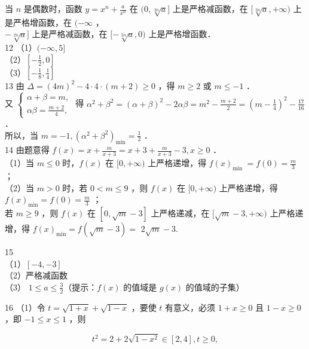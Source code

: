 \documentclass[10pt]{article}
\begin{document}
当 \(n\) 是偶数时，函数 \(y=x^{n}+\frac{a}{x^{n}}\) 在 \((0, \sqrt[2 n]{a}]\) 上是严格减函数，在 \([\sqrt[2 n]{a},+\infty)\) 上是严格增函数，在 \((-\infty\) ，\\
\(-\sqrt[2 n]{a}]\) 上是严格减函数，在 \([-\sqrt[2 n]{a}, 0)\) 上是严格增函数．\\
12 （1）\((-\infty, 5]\)\\
（2）\(\left[-\frac{1}{2}, 0\right]\)\\
（3）\(\left[-\frac{1}{8}, \frac{1}{4}\right]\)\\
13 由 \(\Delta=(4 m)^{2}-4 \cdot 4 \cdot(m+2) \geqslant 0\) ，得 \(m \geqslant 2\) 或 \(m \leqslant-1\) ．\\
又 \(\left\{\begin{array}{l}\alpha+\beta=m, \\ \alpha \beta=\frac{m+2}{4},\end{array}\right.\) 得 \(\alpha^{2}+\beta^{2}=(\alpha+\beta)^{2}-2 \alpha \beta=m^{2}-\frac{m+2}{2}=\left(m-\frac{1}{4}\right)^{2}-\frac{17}{16}\) ．\\
所以，当 \(m=-1,\left(\alpha^{2}+\beta^{2}\right)_{\min }=\frac{1}{2}\) ．\\
14 由题意得 \(f(x)=x+\frac{m}{x+3}=x+3+\frac{m}{x+3}-3, x \geqslant 0\) ．\\
（1）当 \(m \leqslant 0\) 时，\(f(x)\) 在 \([0,+\infty)\) 上严格递增，得 \(f(x)_{\text {min }}=f(0)=\frac{m}{3}\) ；\\
（2）当 \(m>0\) 时，若 \(0<m \leqslant 9\) ，则 \(f(x)\) 在 \([0,+\infty)\) 上严格递增，得 \(f(x)_{\min }=f(0)=\frac{m}{3}\) ；\\
若 \(m \geqslant 9\) ，则 \(f(x)\) 在 \([0, \sqrt{m}-3]\) 上严格递减，在 \([\sqrt{m}-3,+\infty)\) 上严格递增，得 \(f(x)_{\min }=f(\sqrt{m}-3)=\) \(2 \sqrt{m}-3\).

15\\
（1）\([-4,-3]\)\\
（2）严格减函数\\
（3） \(1 \leqslant a \leqslant \frac{3}{2}\)（提示：\(f(x)\) 的值域是 \(g(x)\) 的值域的子集）

16 （1）令 \(t=\sqrt{1+x}+\sqrt{1-x}\) ，要使 \(t\) 有意义，必须 \(1+x \geqslant 0\) 且 \(1-x \geqslant 0\) ，即 \(-1 \leqslant x \leqslant 1\) ，则

\[
t^{2}=2+2 \sqrt{1-x^{2}} \in[2,4], t \geqslant 0,
\]
\end{document}
